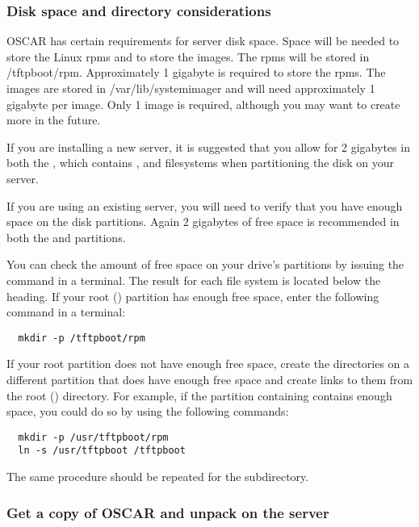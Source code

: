 \subsubsection{Disk space and directory considerations}
\label{det:serverdiskpar}

OSCAR has certain requirements for server disk space. Space will be
needed to store the Linux rpms and to store the images.
The rpms will be stored in /tftpboot/rpm. Approximately 1 gigabyte is required
to store the rpms. 
The images are stored in /var/lib/systemimager and will need approximately
1 gigabyte per image. Only 1 image is required, although you may want to create
more in the future. 

If you are installing a new server, it is suggested that you allow for 
2 gigabytes in both the \file{/}, which contains ,  
and  filesystems when partitioning the disk on your server.

If you are using an existing server, you will need to verify that you have 
enough space on the disk partitions. Again 2 gigabytes of free space
is recommended in both the \file{/} and  partitions.

You can check
the amount of free space on your drive's partitions by issuing the
command  in a terminal.  The result for each file system is
located below the  heading. If your root (\file{/})
partition has enough free space, enter the following command in a
terminal:

\begin{verbatim}
  mkdir -p /tftpboot/rpm
\end{verbatim}
  
If your root partition does not have enough free space, create the
directories on a different partition that does have enough free space
and create links to them from the root (\file{/}) directory.  For
example, if the partition containing  contains enough
space, you could do so by using the following commands:

\begin{verbatim}
  mkdir -p /usr/tftpboot/rpm
  ln -s /usr/tftpboot /tftpboot
\end{verbatim}

The same procedure should be repeated for the 
subdirectory.

    
\subsubsection{Get a copy of OSCAR and unpack on the server} 
\label{det:unpack}

